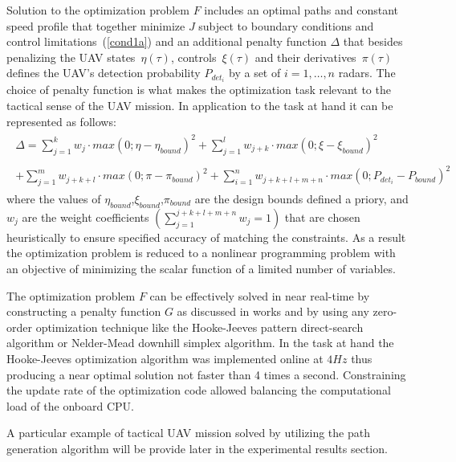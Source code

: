 \documentclass[]{aiaa-tc}%
\begin{document}
Solution to the optimization problem $F$ includes an optimal paths and constant speed
profile that together minimize $J$ subject to boundary conditions and control
limitations~(\ref{cond1a}) and an additional penalty function $\Delta$ that besides
penalizing the UAV states~$\eta(\tau)$, controls~$\xi(\tau)$ and their
derivatives~$\pi(\tau)$ defines the UAV's detection probability $P_{det_i}$ by a set of
${i = 1, \ldots, n}$ radars. The choice of penalty function is what makes the
optimization task relevant to the tactical sense of the UAV mission. In application to
the task at hand it can be represented as follows:
\begin{eqnarray}\label{penalty}
\begin{array}{cr}
\Delta=\sum_{j = 1}^{k} w_j\cdot max(0;\eta-\eta_{bound})^2
         +\sum_{j = 1}^{l} w_{j+k}\cdot  max(0;\xi-\xi_{bound})^2\\\\
          +\sum_{j = 1}^{m}  w_{j+k+l}\cdot  max(0;\pi-\pi_{bound})^2
           +\sum_{i = 1}^{n}  w_{j+k+l+m+n}\cdot  max(0;P_{det_i}-P_{bound})^2
\end{array}
\end{eqnarray}
where the values of $\eta_{bound}$,$\xi_{bound}$,$\pi_{bound}$ are the design bounds
defined a priory, and $w_j$ are the weight coefficients $(\sum_{j = 1}^{j+k+l+m+n} w_j
=1)$ that are chosen heuristically to ensure specified accuracy of matching the
constraints. As a result the optimization problem is reduced to a nonlinear programming
problem with an objective of minimizing the scalar function of a limited number of
variables.

The optimization problem $F$ can be effectively solved in near real-time by
constructing a penalty function $G$ as discussed in works
\cite{Dobr1999_JCSI,JGCD00_Yakimenko} and by using any zero-order optimization
technique like the Hooke-Jeeves pattern direct-search
algorithm\cite{HookeJeevs1961_JACM} or Nelder-Mead downhill simplex
algorithm\cite{NelderMead1965_TCJ}. In the task at hand the Hooke-Jeeves optimization
algorithm was implemented online at $4Hz$ thus producing a near optimal solution not
faster than 4 times a second. Constraining the update rate of the optimization code
allowed balancing the computational load of the onboard CPU.

A particular example of tactical UAV mission solved by utilizing the path generation
algorithm will be provide later in the experimental results section.
\end{document}
